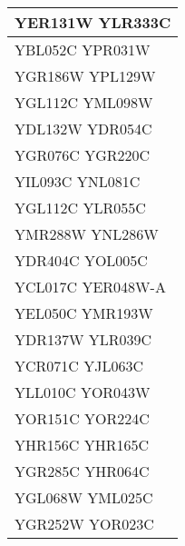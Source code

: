\begin{longtable}{| m{27em} |}
\hline
YER131W YLR333C \\
\hline
YBL052C YPR031W \\
\hline
YGR186W YPL129W \\
\hline
YGL112C YML098W \\
\hline
YDL132W YDR054C \\
\hline
YGR076C YGR220C \\
\hline
YIL093C YNL081C \\
\hline
YGL112C YLR055C \\
\hline
YMR288W YNL286W \\
\hline
YDR404C YOL005C \\
\hline
YCL017C YER048W-A \\
\hline
YEL050C YMR193W \\
\hline
YDR137W YLR039C \\
\hline
YCR071C YJL063C \\
\hline
YLL010C YOR043W \\
\hline
YOR151C YOR224C \\
\hline
YHR156C YHR165C \\
\hline
YGR285C YHR064C \\
\hline
YGL068W YML025C \\
\hline
YGR252W YOR023C \\
\hline
\end{longtable}